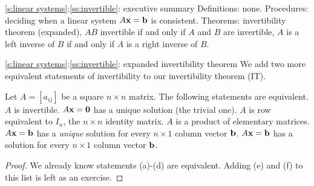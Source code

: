 \begin{frame}{\ref{s:linear systems}:\ref{ss:invertible}: executive summary}
\alert{Definitions:} none.
\bspace
\alert{Procedures:} deciding when a linear system $A{\mathbf x}={\mathbf b}$ is consistent.
\bspace
\alert{Theorems:} invertibility theorem (expanded), $AB$ invertible if and only if $A$ and $B$ are invertible, $A$ is a left inverse of $B$ if and only if $A$ is a right inverse of $B$. 
\end{frame}
\begin{frame}{\ref{s:linear systems}:\ref{ss:invertible}: expanded invertibility theorem}
We add two more equivalent statements of invertibility to our invertibility theorem (IT). 
\begin{theorem}
Let $A=[a_{ij}]$ be a square $n\times n$ matrix. The following statements are equivalent.
\bb[(a)]
\ii $A$ is invertible.
\ii $A{\mathbf x}={\mathbf 0}$ has a unique solution (the trivial one). 
\ii $A$ is row equivalent to $I_n$, the $n\times n$ identity matrix.
\ii $A$ is a product of elementary matrices. 	
\ii $A{\mathbf x}={\mathbf b}$ has a {\em unique} solution for every $n\times 1$ column vector ${\mathbf b}$. 
\ii $A{\mathbf x}={\mathbf b}$ has a solution for every $n\times 1$ column vector ${\mathbf b}$. 
\ee
\end{theorem} 
\pause
\begin{proof}
We already know statements (a)-(d) are equivalent. Adding (e) and (f) to this list is left as an exercise. 
\end{proof}
\end{frame}
